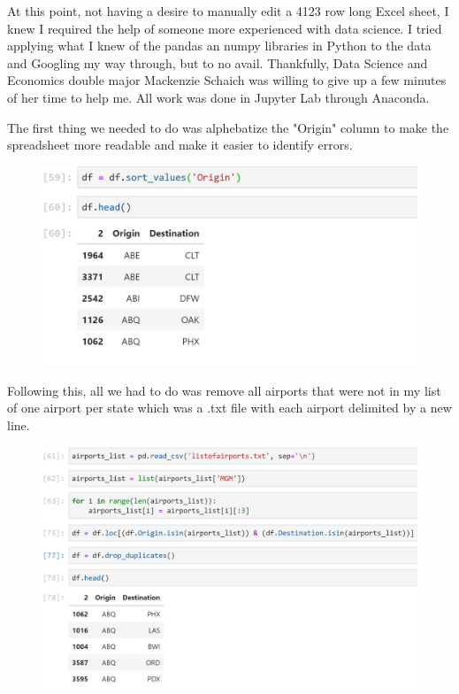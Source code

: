 \documentclass[12pt]{article}
\begin{document}
At this point, not having a desire to manually edit a 4123 row long Excel
sheet, I knew I required the help of someone more experienced with data science. I tried applying
what I knew of the pandas an numpy libraries in Python to the data and 
Googling my way through, but to no avail. Thankfully, Data Science and
Economics double major Mackenzie Schaich was
willing to give up a few minutes of her time to help me. All work was done
in Jupyter Lab through Anaconda.

The first thing we needed to do was alphebatize the "Origin" column to
make the spreadsheet more readable and make it easier to identify errors.

\begin{figure}[h]
       \includegraphics{alphabetize}
       \centering
\end{figure}

\pagebreak

Following this, all we had to do was remove all airports that were not in my
list of one airport per state which was a .txt file with each airport
delimited by a new line.

\begin{figure}[h]
       \includegraphics{dropdups}
       \centering
\end{figure}
\end{document}
